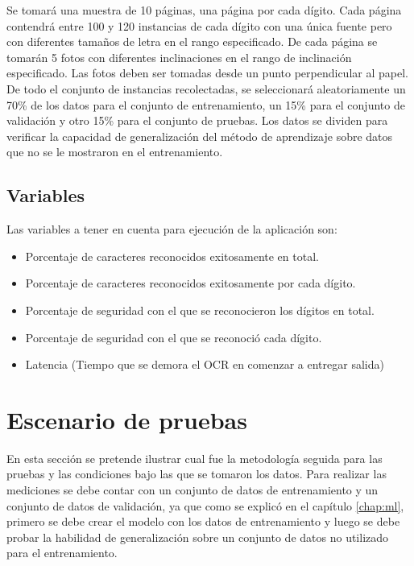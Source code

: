 \documentclass[a4paper, 11pt, oneside]{report}
\begin{document}
Se tomará una muestra de 10 páginas, una página por cada dígito. Cada página contendrá entre 100 y 120 instancias de cada dígito con una única fuente pero con diferentes tamaños de letra en el rango especificado. De cada página se tomarán 5 fotos con diferentes inclinaciones en el rango de inclinación especificado. Las fotos deben ser tomadas desde un punto perpendicular al papel. De todo el conjunto de instancias recolectadas, se seleccionará aleatoriamente un 70\% de los datos para el conjunto de entrenamiento, un 15\% para el conjunto de validación y otro 15\% para el conjunto de pruebas. Los datos se dividen para verificar la capacidad de generalización del método de aprendizaje sobre datos que no se le mostraron en el entrenamiento.

\subsection{Variables}

Las variables a tener en cuenta para ejecución de la aplicación son:

\begin{itemize}

	\item Porcentaje de caracteres reconocidos exitosamente en total.

	\item Porcentaje de caracteres reconocidos exitosamente por cada dígito.

	\item Porcentaje de seguridad con el que se reconocieron los dígitos en total.

	\item Porcentaje de seguridad con el que se reconoció cada dígito.

	\item Latencia (Tiempo que se demora el OCR en comenzar a entregar salida)

\end{itemize}

\section{Escenario de pruebas}
\label{sect:testEnvironment}

En esta sección se pretende ilustrar cual fue la metodología seguida para las pruebas y las condiciones bajo las que se tomaron los datos. Para realizar las mediciones se debe contar con un conjunto de datos de entrenamiento y un conjunto de datos de validación, ya que como se explicó en el capítulo \ref{chap:ml}, primero se debe crear el modelo con los datos de entrenamiento y luego se debe probar la habilidad de generalización sobre un conjunto de datos no utilizado para el entrenamiento.
\end{document}
